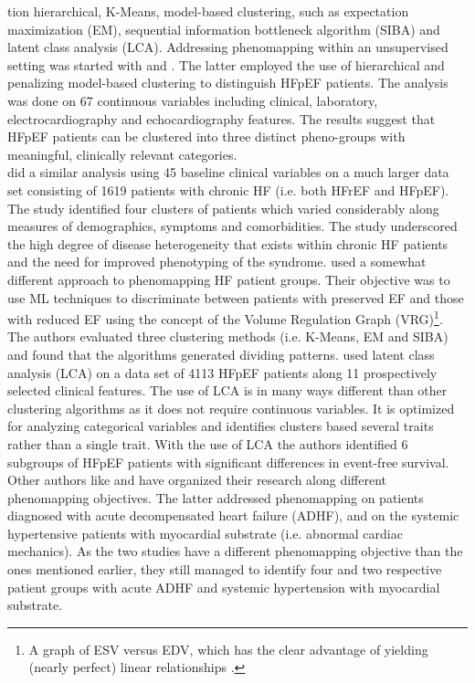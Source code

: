 \documentclass[../thesis.tex]{subfiles}
\begin{document}
\noindent tion hierarchical, K-Means, model-based clustering, such as expectation maximization (EM), sequential information bottleneck algorithm (SIBA) and latent class analysis (LCA). Addressing phenomapping within an unsupervised setting was started with \cite{ahmad2014clinical} and \cite{shah2014phenomapping}. The latter employed the use of hierarchical and penalizing model-based clustering to distinguish HFpEF patients. The analysis was done on 67 continuous variables including clinical, laboratory, electrocardiography and echocardiography features. The results suggest that HFpEF patients can be clustered into three distinct pheno-groups with meaningful, clinically relevant categories.\\
\indent \cite{ahmad2014clinical} did a similar analysis using 45 baseline clinical variables on a much larger data set consisting of 1619 patients with chronic HF (i.e. both HFrEF and HFpEF). The study identified four clusters of patients which varied considerably along measures of demographics, symptoms and comorbidities. The study underscored the high degree of disease heterogeneity that exists within chronic HF patients and the need for improved phenotyping of the syndrome. \cite{alonso2015exploring} used a somewhat different approach to phenomapping HF patient groups. Their objective was to use ML techniques to discriminate between patients with preserved EF and those with reduced EF using the concept of the Volume Regulation Graph (VRG)\footnote{A graph of ESV versus EDV, which has the clear advantage of yielding (nearly perfect) linear relationships \citep{beringer1998unifying}.}. The authors evaluated three clustering methods (i.e. K-Means, EM and SIBA) and found that the algorithms generated dividing patterns. \cite{kao2015characterization} used latent class analysis (LCA) on a data set of 4113 HFpEF patients along 11 prospectively selected clinical features. The use of LCA is in many ways different than other clustering algorithms as it does not require continuous variables. It is optimized for analyzing categorical variables and identifies clusters based several traits rather than a single trait. With the use of LCA the authors identified 6 subgroups of HFpEF patients with significant differences in event-free survival. Other authors like \cite{katz2017phenomapping} and \cite{ahmad2016clinical} have organized their research along different phenomapping objectives. The latter addressed phenomapping on patients diagnosed with acute decompensated heart failure (ADHF), and \cite{katz2017phenomapping} on the systemic hypertensive patients with myocardial substrate (i.e. abnormal cardiac mechanics). As the two studies have a different phenomapping objective than the ones mentioned earlier, they still managed to identify four and two respective patient groups with acute ADHF and systemic hypertension with myocardial substrate.\\
\end{document}
